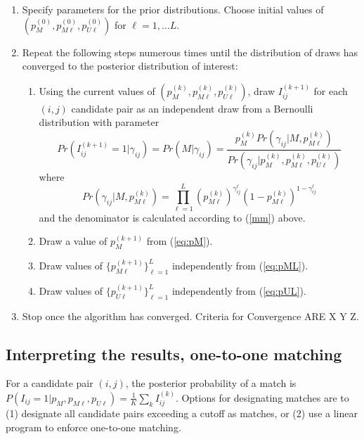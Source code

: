 \documentclass[11pt,reqno]{amsart}
\begin{document}
\begin{enumerate}
\item Specify parameters for the prior distributions.  Choose initial values of $\left(p_M^{(0)}, p_{M\ell}^{(0)}, p_{U\ell}^{(0)}\right)$ for $\ell=1,\dots L$.  

\item Repeat the following steps numerous times until the distribution of draws has converged to the posterior distribution of interest:
\begin{enumerate}

\item Using the current values of $\left(p_M^{(k)}, p_{M\ell}^{(k)}, p_{U\ell}^{(k)}\right)$, draw $I_{ij}^{(k+1)}$ for each $(i,j)$ candidate pair as an independent draw from a Bernoulli distribution with parameter
\begin{equation}
Pr\left( I_{ij}^{(k+1)}=1 \Big| \gamma_{ij}\right) = Pr\left(M | \gamma_{ij}\right) = \frac{p_M^{(k)}Pr\left(\gamma_{ij} | M, p_{M\ell}^{(k)} \right)}{Pr\left(\gamma_{ij} \Big | p_M^{(k)}, p_{M\ell}^{(k)}, p_{U\ell}^{(k)}\right)}
\end{equation} where 
$$ Pr\left(\gamma_{ij} | M, p_{M\ell}^{(k)} \right) = \prod_{\ell=1}^L  \left(p_{M\ell}^{(k)}\right)^{\gamma_{ij}^{\ell}}\left(1-p_{M\ell}^{(k)}\right)^{1-\gamma_{ij}^{\ell}}$$ and the denominator is calculated according to (\ref{mm}) above. 
\item Draw a value of $p_M^{(k+1)}$ from (\ref{eq:pM}).
\item Draw values of $\{p_{M\ell}^{(k+1)}\}_{\ell=1}^L$ independently from (\ref{eq:pML}). 
\item Draw values of $\{p_{U\ell}^{(k+1)}\}_{\ell=1}^L$ independently from (\ref{eq:pUL}). 
\end{enumerate}
\item Stop once the algorithm has converged.  Criteria for Convergence ARE X Y Z. %
\end{enumerate}
\subsection{Interpreting the results, one-to-one matching}  For a candidate pair $(i,j)$, the posterior probability of a match is $P(I_{ij}  = 1 | p_M, p_{M\ell}, p_{U\ell}) = \frac{1}{K}\sum_k I_{ij}^{(k)}$.  Options for designating matches are to (1) designate all candidate pairs exceeding a cutoff as matches, or (2) use a linear program to enforce one-to-one matching.   
\end{document}
